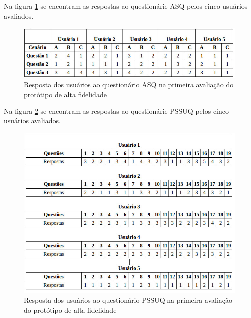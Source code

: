       Na figura \ref{asqalta} se encontram as respostas ao questionário ASQ pelos cinco usuários avaliados.
      
      \begin{figure}[!htb]
      \centering
      \includegraphics[scale=0.6]{figuras/asqalta.jpg}
      \caption{Resposta dos usuários ao questionário ASQ na primeira avaliação do protótipo de alta fidelidade}
      \label{asqalta}
      \end{figure}
      
      Na figura \ref{pssuqalta} se encontram as respostas ao questionário PSSUQ pelos cinco usuários avaliados.
      
      \begin{figure}[!htb]
      \centering
      \includegraphics[scale=0.6]{figuras/pssuqalta.jpg}
      \caption{Resposta dos usuários ao questionário PSSUQ na primeira avaliação do protótipo de alta fidelidade}
      \label{pssuqalta}
      \end{figure}

